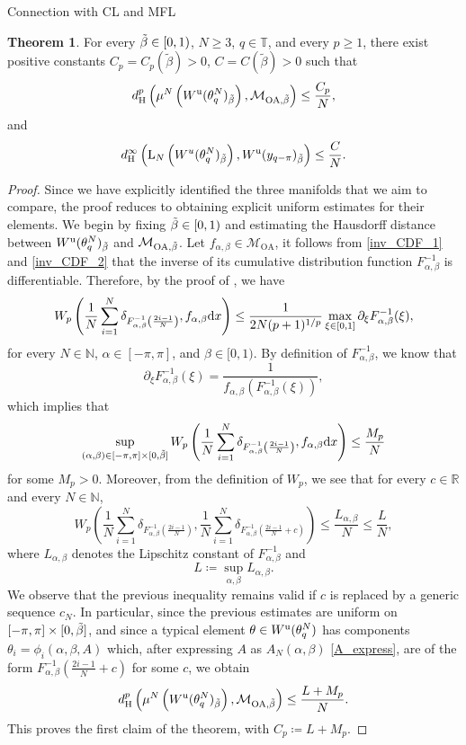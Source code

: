 \documentclass{article}
\theoremstyle{definition}
\newtheorem{theorem}[definition]{Theorem}
\newcommand{\R}{\mathbb{R}}
\newcommand{\N}{\mathbb{N}}
\newcommand{\T}{\mathbb{T}}
\renewcommand{\u}{\textnormal{u}}
\renewcommand{\d}{\textnormal{d}}
\renewcommand{\L}{\operatorname{L}}
\renewcommand{\H}{\operatorname{H}}
\newcommand{\OA}{\mathcal{M}_{\mathrm{OA}}}
\begin{document}
\begin{section}{Connection with CL and MFL}
\begin{theorem}\label{conv_manifolds}
For every $\Tilde{\beta}\in[0,1)$, $N\geq3$, $q\in\T$, and every $p\geq1$, there exist positive constants $C_p=C_p(\tilde{\beta})>0$, $C=C(\tilde{\beta})>0$ such that
\begin{equation}\label{est_MFL}
d_{\H}^p\left(\mu^N\left(W^\u(\theta^N_q)_{\Tilde{\beta}}\right),\mathcal{M}_{\mathrm{OA},{\Tilde{\beta}}}\right)\leq\frac{C_p}{N},
\end{equation}
and
\begin{equation}\label{est_CL}
    d_{\H}^{\infty}\left(\L_N\left(W^u(\theta^N_q)_{\Tilde{\beta}}\right),W^\u(y_{q-\pi})_{\Tilde{\beta}}\right)\leq\frac{C}{N}.
\end{equation}
\end{theorem}
\begin{proof}
Since we have explicitly identified the three manifolds that we aim to compare, the proof reduces to obtaining explicit uniform estimates for their elements. We begin by fixing $\Tilde{\beta}\in[0,1)$ and estimating the Hausdorff distance between $W^\u(\theta^N_q)_{\Tilde{\beta}}$ and $\mathcal{M}_{\mathrm{OA},{\Tilde{\beta}}}$. Let $f_{\alpha,\beta}\in\OA$, it follows from \eqref{inv_CDF_1} and \eqref{inv_CDF_2} that the inverse of its cumulative distribution function $F^{-1}_{\alpha,\beta}$ is differentiable. Therefore, by the proof of \cite[Theorem 5.15]{xu2019best}, we have
$$W_p\left(\frac{1}{N}\sum_{i=1}^N\delta_{F^{-1}_{\alpha,\beta}\left(\frac{2i-1}{N}\right)},f_{\alpha,\beta}\d x\right)\leq\frac{1}{2N(p+1)^{1/p}}\max_{\xi\in[0,1]}\partial_\xi F^{-1}_{\alpha,\beta}(\xi),$$
for every $N\in\N$, $\alpha\in[-\pi,\pi]$, and $\beta\in[0,1)$. By definition of $F^{-1}_{\alpha,\beta}$, we know that
$$\partial_\xi F^{-1}_{\alpha,\beta}(\xi)=\frac{1}{f_{\alpha,\beta}(F^{-1}_{\alpha,\beta}(\xi))},$$
which implies that
$$\sup_{(\alpha,\beta)\in[-\pi,\pi]\times[0,\Tilde{\beta}]}W_p\left(\frac{1}{N}\sum_{i=1}^N\delta_{F^{-1}_{\alpha,\beta}\left(\frac{2i-1}{N}\right)},f_{\alpha,\beta}\d x\right)\leq \frac{M_p}{N}$$
for some $M_p>0$. Moreover, from the definition of $W_p$, we see that for every $c\in\R$ and every $N\in\N$,
$$W_p\left(\frac{1}{N}\sum_{i=1}^N\delta_{F^{-1}_{\alpha,\beta}\left(\frac{2i-1}{N}\right)},\frac{1}{N}\sum_{i=1}^N\delta_{F^{-1}_{\alpha,\beta}\left(\frac{2i-1}{N}+c\right)}\right)\leq\frac{L_{\alpha,\beta}}{N}\leq\frac{L}{N},$$
where $L_{\alpha,\beta}$ denotes the Lipschitz constant of $F^{-1}_{\alpha,\beta}$ and
$$L\coloneqq\sup_{\alpha,\beta}L_{\alpha,\beta}.$$
We observe that the previous inequality remains valid if $c$ is replaced by a generic sequence $c_N$. In particular, since the previous estimates are uniform on $[-\pi,\pi]\times[0,\Tilde{\beta}]$, and since a typical element $\theta\in W^\u(\theta^N_q)$ has components $\theta_i=\phi_i(\alpha,\beta,A)$ which, after expressing $A$ as $A_N(\alpha,\beta)$ \eqref{A_express}, are of the form $F^{-1}_{\alpha,\beta}(\frac{2i-1}{N}+c)$ for some $c$, we obtain
$$d_{\H}^p\left(\mu^N\left(W^\u(\theta^N_q)_{\Tilde{\beta}}\right),\mathcal{M}_{\mathrm{OA},{\Tilde{\beta}}}\right)\leq\frac{L+M_p}{N}.$$
This proves the first claim of the theorem, with $C_p\coloneqq L+M_p$.


\end{proof}
\end{section}
\end{document}
